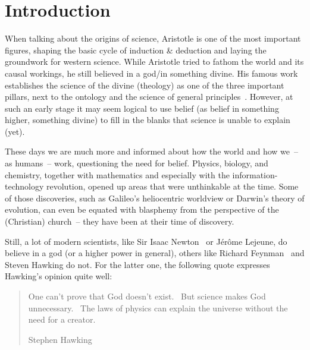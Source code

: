 \section{Introduction}

When talking about the origins of science, Aristotle is one of the most important figures, shaping the basic cycle of induction \& deduction and laying the groundwork for western science.
While Aristotle tried to fathom the world and its causal workings, he still believed in a god/in something divine.
His famous work  establishes the science of the divine (theology) as one of the three important pillars, next to the ontology and the science of general principles~\cite{aristotle350}.
However, at such an early stage it may seem logical to use belief (as belief in something higher, something divine) to fill in the blanks that science is unable to explain (yet).

These days we are much more  and informed about how the world and how we~-- as humans~-- work, questioning the need for belief.
Physics, biology, and chemistry, together with mathematics and especially with the information-technology revolution, opened up areas that were unthinkable at the time.
Some of those discoveries, such as Galileo's heliocentric worldview or Darwin's theory of evolution, can even be equated with blasphemy from the perspective of the (Christian) church~-- they have been at their time of discovery.

Still, a lot of modern scientists, like Sir Isaac Newton~\cite[p. 315]{westfall1983} or Jérôme Lejeune, do believe in a god (or a higher power in general), others like Richard Feynman~\cite{feynman2001,brian2001} and Steven Hawking do not.
For the latter one, the following quote expresses Hawking's opinion quite well:
\blockquote[Stephen Hawking]{One can't prove that God doesn't exist. \quoteshorten\ But science makes God unnecessary. \quoteshorten\ The laws of physics can explain the universe without the need for a creator.}


